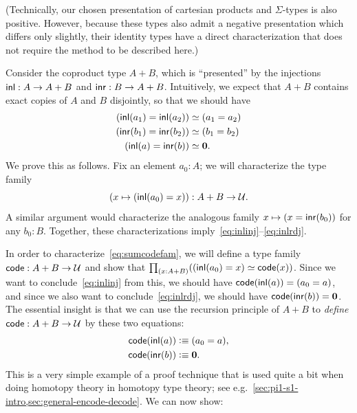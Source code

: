 (Technically, our chosen presentation of cartesian products and $\Sigma$-types is also positive.
However, because these types also admit a negative presentation which differs only slightly, their identity types have a direct characterization that does not require the method to be described here.)

Consider the coproduct type $A+B$, which is ``presented'' by the injections ${\mathsf{inl}}:A\to A+B$ and ${\mathsf{inr}}:B\to A+B$.
Intuitively, we expect that $A+B$ contains exact copies of $A$ and $B$ disjointly, so that we should have
\begin{align}
  {(\inl(a_1)=\inl(a_2))}&\eqvsym {(a_1=a_2)} \label{eq:inlinj}\\
  {(\inr(b_1)=\inr(b_2))}&\eqvsym {(b_1=b_2)}\\
  {(\inl(a)= \inr(b))} &\eqvsym {\emptyt}. \label{eq:inlrdj}
\end{align}
We prove this as follows.
Fix an element $a_0:A$; we will characterize the type family
\begin{equation}
  (x\mapsto (\inl(a_0)=x)) : A+B \to \type.\label{eq:sumcodefam}
\end{equation}
A similar argument would characterize the analogous family $x\mapsto (x = {\mathsf{inr}}(b_0))$ for any $b_0:B$.
Together, these characterizations imply~\eqref{eq:inlinj}--\eqref{eq:inlrdj}.

In order to characterize~\eqref{eq:sumcodefam}, we will define a type family $\mathsf{code}:A+B\to\mathcal{U}$ and show that $\prd{x:A+B} (\eqv{(\inl(a_0)=x)}{\code(x)})$.
Since we want to conclude~\eqref{eq:inlinj} from this, we should have $\mathsf{code}({\mathsf{inl}}(a)) = (a_0=a)$, and since we also want to conclude~\eqref{eq:inlrdj}, we should have $\mathsf{code} ({\mathsf{inr}}(b)) = \mathbf{0}$.
The essential insight is that we can use the recursion principle of $A+B$ to \emph{define} $\mathsf{code}:A+B\to\mathcal{U}$ by these two equations:
\begin{align*}
  \mathsf{code}({\mathsf{inl}}(a)) &\vcentcolon\equiv (a_0=a),\\
  \mathsf{code}({\mathsf{inr}}(b)) &\vcentcolon\equiv \mathbf{0}.
\end{align*}
This is a very simple example of a proof technique that is used quite a
bit when doing homotopy theory in homotopy type theory; see
e.g.\ \cref{sec:pi1-s1-intro,sec:general-encode-decode}.
%
We can now show:

